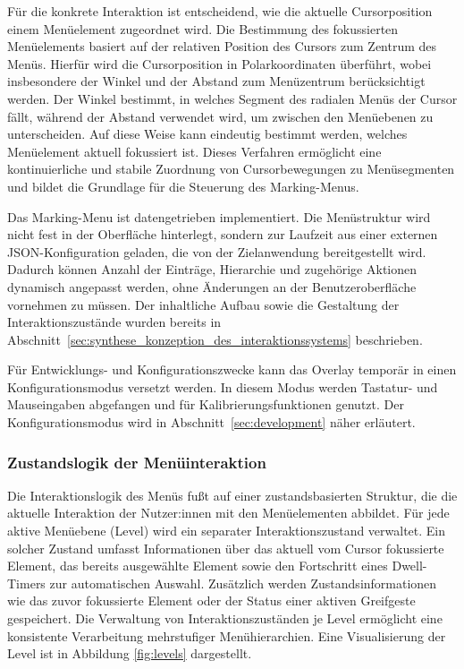 Für die konkrete Interaktion ist entscheidend, wie die aktuelle Cursorposition einem Menüelement zugeordnet wird. Die Bestimmung des fokussierten Menüelements basiert auf der relativen Position des Cursors zum Zentrum des Menüs. Hierfür wird die Cursorposition in Polarkoordinaten überführt, wobei insbesondere der Winkel und der Abstand zum Menüzentrum berücksichtigt werden. Der Winkel bestimmt, in welches Segment des radialen Menüs der Cursor fällt, während der Abstand verwendet wird, um zwischen den Menüebenen zu unterscheiden. Auf diese Weise kann eindeutig bestimmt werden, welches Menüelement aktuell fokussiert ist. Dieses Verfahren ermöglicht eine kontinuierliche und stabile Zuordnung von Cursorbewegungen zu Menüsegmenten und bildet die Grundlage für die Steuerung des Marking-Menus.

Das Marking-Menu ist datengetrieben implementiert. Die Menüstruktur wird nicht fest in der Oberfläche hinterlegt, sondern zur Laufzeit aus einer externen JSON-Konfiguration geladen, die von der Zielanwendung bereitgestellt wird. Dadurch können Anzahl der Einträge, Hierarchie und zugehörige Aktionen dynamisch angepasst werden, ohne Änderungen an der Benutzeroberfläche vornehmen zu müssen. Der inhaltliche Aufbau sowie die Gestaltung der Interaktionszustände wurden bereits in Abschnitt~\ref{sec:synthese_konzeption_des_interaktionssystems} beschrieben.

Für Entwicklungs- und Konfigurationszwecke kann das Overlay temporär in einen Konfigurationsmodus versetzt werden. In diesem Modus werden Tastatur- und Mauseingaben abgefangen und für Kalibrierungsfunktionen genutzt. Der Konfigurationsmodus wird in Abschnitt~\ref{sec:development} näher erläutert.


\subsubsection{Zustandslogik der Menüinteraktion}
Die Interaktionslogik des Menüs fußt auf einer zustandsbasierten Struktur, die die aktuelle Interaktion der Nutzer:innen mit den Menüelementen abbildet.
Für jede aktive Menüebene (Level) wird ein separater Interaktionszustand verwaltet.
Ein solcher Zustand umfasst Informationen über das aktuell vom Cursor fokussierte Element, das bereits ausgewählte Element sowie den Fortschritt eines Dwell-Timers zur automatischen Auswahl.
Zusätzlich werden Zustandsinformationen wie das zuvor fokussierte Element oder der Status einer aktiven Greifgeste gespeichert.
Die Verwaltung von Interaktions\-zuständen je Level ermöglicht eine konsistente Verarbeitung mehrstufiger Menühierarchien. Eine Visuali\-sierung der Level ist in Abbildung \ref{fig:levels} dargestellt.

